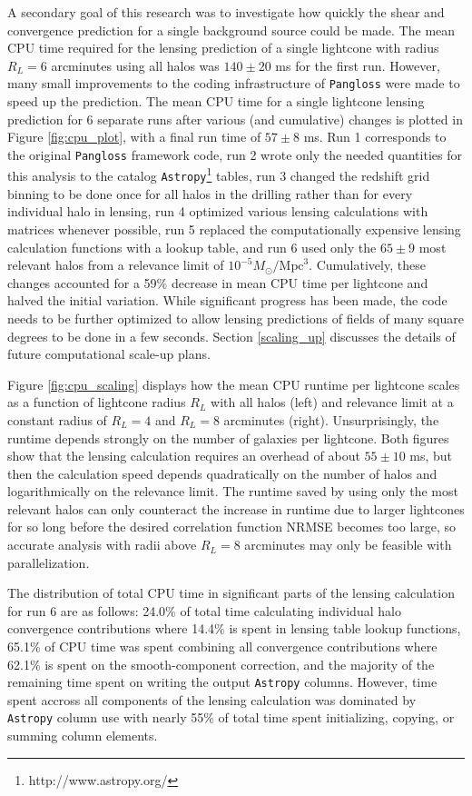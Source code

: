 \documentclass[%
 reprint,
 amsmath,amssymb,
 aps,nofootinbib
]{revtex4-1}
\begin{document}
A secondary goal of this research was to investigate how quickly the shear and convergence prediction for a single background source could be made. The mean CPU time required for the lensing prediction of a single lightcone with radius $R_L=6$ arcminutes using all halos was ${140\pm20}$ ms for the first run. However, many small improvements to the coding infrastructure of \texttt{Pangloss} were made to speed up the prediction. The mean CPU time for a single lightcone lensing prediction for 6 separate runs after various (and cumulative) changes is plotted in Figure \ref{fig:cpu_plot}, with a final run time of $57\pm8$ ms. Run 1 corresponds to the original \texttt{Pangloss} framework code, run 2 wrote only the needed quantities for this analysis to the catalog \texttt{Astropy}\footnote{http://www.astropy.org/} tables, run 3 changed the redshift grid binning to be done once for all halos in the drilling rather than for every individual halo in lensing, run 4 optimized various lensing calculations with matrices whenever possible, run 5 replaced the computationally expensive lensing calculation functions with a lookup table, and run 6 used only the ${65\pm9}$ most relevant halos from a relevance limit of ${10^{-5}M_\odot/\text{Mpc}^3}$. Cumulatively, these changes accounted for a 59\% decrease in mean CPU time per lightcone and halved the initial variation. While significant progress has been made, the code needs to be further optimized to allow lensing predictions of fields of many square degrees to be done in a few seconds. Section \ref{scaling_up} discusses the details of future computational scale-up plans.

Figure \ref{fig:cpu_scaling} displays how the mean CPU runtime per lightcone scales as a function of lightcone radius $R_L$ with all halos (left) and relevance limit at a constant radius of $R_L=4$ and $R_L=8$ arcminutes (right). Unsurprisingly, the runtime depends strongly on the number of galaxies per lightcone. Both figures show that the lensing calculation requires an overhead of about ${55\pm10}$ ms, but then the calculation speed depends quadratically on the number of halos and logarithmically on the relevance limit. The runtime saved by using only the most relevant halos can only counteract the increase in runtime due to larger lightcones for so long before the desired correlation function NRMSE becomes too large, so accurate analysis with radii above $R_L=8$ arcminutes may only be feasible with parallelization.

The distribution of total CPU time in significant parts of the lensing calculation for run 6 are as follows: 24.0\% of total time calculating individual halo convergence contributions where 14.4\% is spent in lensing table lookup functions, 65.1\% of CPU time was spent combining all convergence contributions where 62.1\% is spent on the smooth-component correction, and the majority of the remaining time spent on writing the output \texttt{Astropy} columns. However, time spent accross all components of the lensing calculation was dominated by \texttt{Astropy} column use with nearly 55\% of total time spent initializing, copying, or summing column elements.
\end{document}
